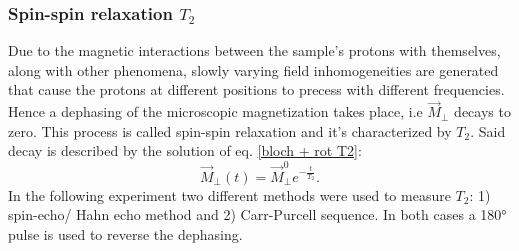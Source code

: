 \subsubsection{Spin-spin relaxation $T_2$}
Due to the magnetic interactions between the sample's protons with themselves, along with other phenomena, slowly varying field inhomogeneities are generated that cause
the protons at different positions to precess with different frequencies. Hence a dephasing of the microscopic magnetization takes place, i.e $\vec{M}_\perp$ decays to zero. This process is called spin-spin relaxation and it's characterized by $T_2$. Said decay is described by the solution of eq. \ref{bloch + rot T2}:
\begin{equation}
\label{eq: sol. bloch T2}
\vec{M}_{\perp}(t)= \vec{M}_\perp^{0}e^{-\frac{t}{T_2}}.
\end{equation}
In the following experiment two different methods were used to measure $T_2$: 1) spin-echo/ Hahn echo method and 2) Carr-Purcell sequence. In both cases a 180° pulse is used to reverse the dephasing. 
